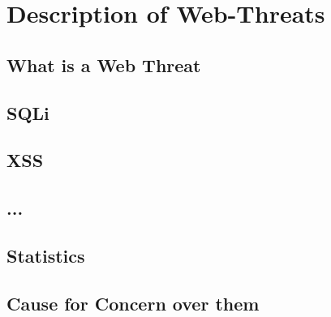 \chapter{Description of Web-Threats}

\section{What is a Web Threat}

\section{SQLi}

\section{XSS}

\section{...}

\section{Statistics}

\section{Cause for Concern over them}



